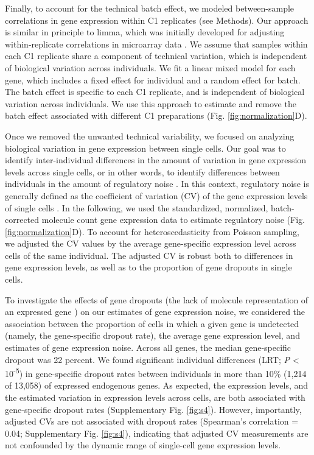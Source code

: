 Finally, to account for the technical batch effect, we modeled
between-sample correlations in gene expression within C1 replicates (see
Methods). Our approach is similar in principle to limma, which was
initially developed for adjusting within-replicate correlations in
microarray data \citep{Smyth2005}. We assume that samples within each C1
replicate share a component of technical variation, which is independent
of biological variation across individuals. We fit a linear mixed model
for each gene, which includes a fixed effect for individual and a random
effect for batch. The batch effect is specific to each C1 replicate, and
is independent of biological variation across individuals. We use this
approach to estimate and remove the batch effect associated with
different C1 preparations (Fig. \ref{fig:normalization}D).

Once we removed the unwanted technical variability, we focused on
analyzing biological variation in gene expression between single cells.
Our goal was to identify inter-individual differences in the amount of
variation in gene expression levels across single cells, or in other
words, to identify differences between individuals in the amount of
regulatory noise \citep{Raser2005}. In this context, regulatory noise is
generally defined as the coefficient of variation (CV) of the gene
expression levels of single cells \citep{Fehrmann2013}. In the following,
we used the standardized, normalized, batch-corrected molecule count
gene expression data to estimate regulatory noise (Fig. \ref{fig:normalization}D). To account
for heteroscedasticity from Poisson sampling, we adjusted the CV values
by the average gene-specific expression level across cells of the same
individual. The adjusted CV is robust both to differences in gene
expression levels, as well as to the proportion of gene dropouts in
single cells.

To investigate the effects of gene dropouts (the lack of molecule
representation of an expressed gene \citep{Brennecke2013, Shalek2013})
on our estimates of gene expression noise, we considered the association
between the proportion of cells in which a given gene is undetected
(namely, the gene-specific dropout rate), the average gene expression
level, and estimates of gene expression noise. Across all genes, the
median gene-specific dropout was 22 percent. We found significant
individual differences (LRT; \emph{P} \textless{}
10\textsuperscript{-5}) in gene-specific dropout rates between
individuals in more than 10\% (1,214 of 13,058) of expressed endogenous
genes. As expected, the expression levels, and the estimated variation
in expression levels across cells, are both associated with
gene-specific dropout rates (Supplementary Fig. \ref{fig:s4}). However,
importantly, adjusted CVs are not associated with dropout rates
(Spearman's correlation = 0.04; Supplementary Fig. \ref{fig:s4}), indicating that
adjusted CV measurements are not confounded by the dynamic range of
single-cell gene expression levels.

